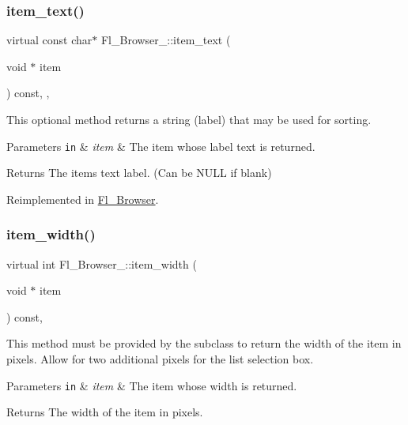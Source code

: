 \subsubsection{\texorpdfstring{item\+\_\+text()}{item\_text()}}
{\footnotesize\ttfamily virtual const char$\ast$ Fl\+\_\+\+Browser\+\_\+\+::item\+\_\+text (\begin{DoxyParamCaption}\item[{void $\ast$}]{item }\end{DoxyParamCaption}) const\hspace{0.3cm}{\ttfamily [inline]}, {\ttfamily [protected]}, {\ttfamily [virtual]}}

This optional method returns a string (label) that may be used for sorting. 
\begin{DoxyParams}[1]{Parameters}
\mbox{\tt in}  & {\em item} & The item whose label text is returned. \\
\hline
\end{DoxyParams}
\begin{DoxyReturn}{Returns}
The item\textquotesingle{}s text label. (Can be N\+U\+LL if blank) 
\end{DoxyReturn}


Reimplemented in \hyperlink{class_fl___browser_add545302a6a8b2a611f6cc4e60475bca}{Fl\+\_\+\+Browser}.

\mbox{\label{class_fl___browser___a3b84b5418ac2554dfaaeb50cfba63569}} 
\subsubsection{\texorpdfstring{item\+\_\+width()}{item\_width()}}
{\footnotesize\ttfamily virtual int Fl\+\_\+\+Browser\+\_\+\+::item\+\_\+width (\begin{DoxyParamCaption}\item[{void $\ast$}]{item }\end{DoxyParamCaption}) const\hspace{0.3cm}{\ttfamily [protected]}, {}}

This method must be provided by the subclass to return the width of the {\ttfamily item} in pixels. Allow for two additional pixels for the list selection box. 
\begin{DoxyParams}[1]{Parameters}
\mbox{\tt in}  & {\em item} & The item whose width is returned. \\
\hline
\end{DoxyParams}
\begin{DoxyReturn}{Returns}
The width of the item in pixels. 
\end{DoxyReturn}


